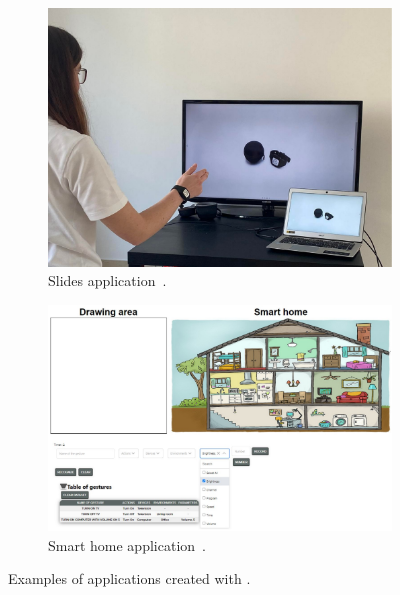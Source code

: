 \begin{figure}[t]
    \vspace{2pt}
    \begin{subfigure}{.455\textwidth}
        \centering
        \includegraphics[width=\linewidth,trim={0 0 1cm 0cm},clip]{Figures/QuantumLeap/Applications/slides-prototype.pdf}  
        \vspace{-15pt}
        \captionsetup{width=.9\linewidth}
        \caption{Slides application~\cite{Steeman:2022}.}
        \label{fig:quantumleap:apps:slides}
    \end{subfigure}
    \begin{subfigure}{.535\textwidth}
        \centering
        \includegraphics[width=\linewidth,trim={0.1cm 0.1cm 0.1cm 0.1cm},clip]{Figures/QuantumLeap/Applications/smart-home-prototype.pdf}  
        \vspace{-15pt}
        \captionsetup{width=.9\linewidth}
        \caption{Smart home application~\cite{Moinnet:2022}.}
        \label{fig:quantumleap:apps:smart-home}
    \end{subfigure}

    \caption{Examples of applications created with \ql.}
    \label{fig:quantumleap:apps}
\end{figure}


